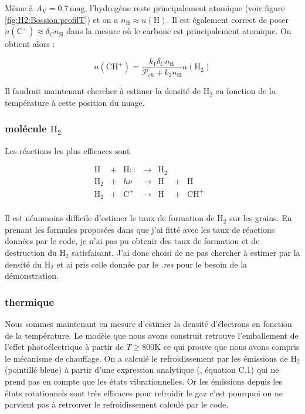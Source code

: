 Même à $A_\mathrm{V} = 0.7 \,\mathrm{mag}$, l'hydrogène reste principalement atomique (voir figure \ref{fig:H2:Bossion:profilT}) et on a $n_\mathrm{H}\approx n(\mathrm{H})$. Il est également correct de poser $n(\mathrm{C}^+)\approx \delta_C n_\mathrm{H}$ dans la mesure où le carbone est principalement atomique. On obtient alors :

\begin{equation}
\boxed{
    n(\mathrm{CH}^+) = \frac{k_1\delta_Cn_\mathrm{H}}{\mathcal{P}_{ch} + k_2n_\mathrm{H}} n(\mathrm{H}_2)
    }
\end{equation}

Il faudrait maintenant chercher à estimer la densité de $\mathrm{H}_2$ en fonction de la température à cette position du nuage. 

\subsubsection{molécule $\mathrm{H}_2$}

Les réactions les plus efficaces sont  

\begin{equation}\label{eq:sysH}
    \begin{array}{lllllllr}
        \mathrm{H}    & + &\mathrm{H}::   & \rightarrow &\mathrm{H}_2  & & &   \\
        \mathrm{H}_2  & + & h\nu  & \rightarrow &\mathrm{H}   & +  & \mathrm{H} &  \\
        \mathrm{H}_2  & + & \mathrm{C}^+  & \rightarrow &\mathrm{H}   & +  & \mathrm{CH}^+ &  \\
    \end{array}
\end{equation}

Il est néanmoins difficile d'estimer le taux de formation de $\mathrm{H}_2$ sur les grains. En prenant les formules proposées dans \cite{Rollig2005} que j'ai fitté avec les taux de réactions données par le code, je n'ai pas pu obtenir des taux de formation et de destruction du $\mathrm{H}_2$ satisfaisant. J'ai donc choisi de ne pas chercher à estimer par la densité du $\mathrm{H}_2$ et ai pris celle donnée par le \textit{.res} pour le besoin de la démonstration.

\subsubsection{thermique}

Nous sommes maintenant en mesure d'estimer la densité d'électrons en fonction de la température. Le modèle que nous avons construit retrouve l'emballement de l'effet photoélectrique à partir de $T\geq 800$K ce qui prouve que nous avons compris le mécanisme de chauffage. On a calculé le refroidissement par les émissions de $\mathrm{H}_2$ (pointillé bleue) à partir d'une expression analytique (\cite{Rollig2005}, équation C.1) qui ne prend pas en compte que les états vibrationnelles. Or les émissions depuis les états rotationnels sont très efficaces pour refroidir le gaz c'est pourquoi on ne parvient pas à retrouver le refroidissement calculé par le code. 

